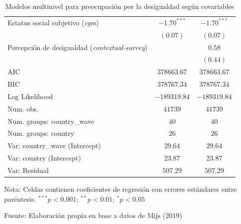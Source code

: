 \documentclass[
  12pt,
  a4paper,
]{article}
\begin{document}
\begin{table}[H]
\begin{center}
{\begin{threeparttable}
\begin{tabular}{l c c}
Estatus social subjetivo (\textit{cgm})                                 & $-1.70^{***}$ & $-1.70^{***}$ \\
                                                                        & $(0.07)$      & $(0.07)$      \\
Percepción de desigualdad (\textit{contextual-survey})                  &               & $0.58$        \\
                                                                        &               & $(0.44)$      \\
\midrule
AIC                                                                     & $378663.67$   & $378663.67$   \\
BIC                                                                     & $378767.34$   & $378767.34$   \\
Log Likelihood                                                          & $-189319.84$  & $-189319.84$  \\
Num. obs.                                                               & $41739$       & $41739$       \\
Num. groups: country\_wave                                              & $40$          & $40$          \\
Num. groups: country                                                    & $26$          & $26$          \\
Var: country\_wave (Intercept)                                          & $29.64$       & $29.64$       \\
Var: country (Intercept)                                                & $23.87$       & $23.87$       \\
Var: Residual                                                           & $507.29$      & $507.29$      \\
\bottomrule
\end{tabular}
\begin{tablenotes}[flushleft]
\scriptsize{\item Nota: Celdas contienen coeficientes de regresión con errores estándares entre paréntesis. $^{***}p<0.001$; $^{**}p<0.01$; $^{*}p<0.05$ \\ \item Fuente: Elaboración propia en base a datos de Mijs (2019)}
\end{tablenotes}
\end{threeparttable}
}
\caption{\label{tab:table4} Modelos multinivel para preocupación por la desigualdad según covariables}
\label{table:coefficients}
\end{center}
\end{table}
\end{document}
